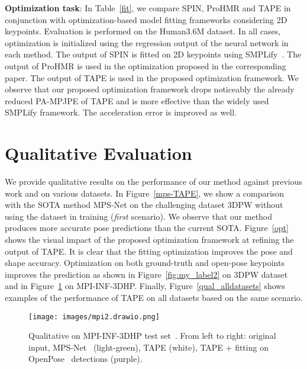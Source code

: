 \documentclass[runningheads]{llncs}
\begin{document}
\vspace*{0.1cm}\noindent\textbf{Optimization task}:
In Table~\ref{fit}, we compare SPIN\cite{kolotouros2019cmr}, ProHMR\cite{kolotouros2021prohmr} and TAPE in conjunction with  optimization-based model fitting frameworks considering 2D keypoints. Evaluation is performed on the Human3.6M dataset. In all cases, optimization is initialized using the regression output of the neural network in each method. The output of SPIN is fitted on 2D keypoints using SMPLify~\cite{Bogo:ECCV:2016}. The output of ProHMR is used in the optimization proposed in the corresponding paper. The output of TAPE is used in the proposed optimization framework. We observe that our proposed optimization framework drops noticeably the already reduced PA-MPJPE of TAPE and is more effective than the widely used SMPLify framework. The acceleration error is improved as well.


\section{Qualitative Evaluation}

We provide qualitative results on the performance of our method against previous work and on various datasets. In Figure~\ref{mps-TAPE}, we show a comparison with the SOTA method MPS-Net on the challenging dataset 3DPW without using the dataset in training (\textit{first} scenario). We observe that our method produces more accurate pose predictions than the current SOTA. 
Figure~\ref{opt} shows the visual impact of the proposed optimization framework at refining the output of TAPE. It is clear that the fitting optimization improves the pose and shape accuracy. 
Optimization on both ground-truth and open-pose keypoints improves the prediction as shown in Figure~\ref{fig:my_label2} on 3DPW dataset and in Figure~\ref{fig:my_label4} on MPI-INF-3DHP.
Finally, Figure~\ref{qual_alldatasets} shows examples of the performance of TAPE on all datasets based on the same scenario. 




\begin{figure}[t]
    \centering
    \texttt{[image: images/mpi2.drawio.png]}
    \caption{Qualitative on MPI-INF-3DHP test set~\cite{mono-3dhp2017}. From left to right: original input, MPS-Net~\cite{WeiLin2022mpsnet} (light-green), TAPE (white), TAPE + fitting on OpenPose~\cite{wei2016cpm} detections (purple).}
    \label{fig:my_label4}
\end{figure}
\end{document}
